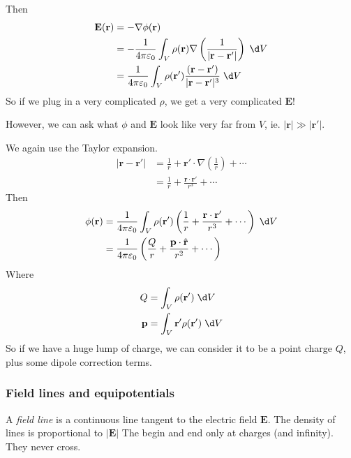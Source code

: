 \documentclass[a4paper]{article}
\begin{document}
Then
\begin{align*}
  \mathbf{E}(\mathbf{r}) &= -\nabla \phi(\mathbf{r})\\
  &=- \frac{1}{4\pi\varepsilon_0} \int_V \rho(\mathbf{r})\nabla \left(\frac{1}{|\mathbf{r} - \mathbf{r}'|}\right)\;\d V\\
  &= \frac{1}{4\pi\varepsilon_0}\int_V \rho(\mathbf{r}')\frac{(\mathbf{r} - \mathbf{r}')}{|\mathbf{r} - \mathbf{r}'|^3}\;\d V
\end{align*}
So if we plug in a very complicated $\rho$, we get a very complicated $\mathbf{E}$!

However, we can ask what $\phi$ and $\mathbf{E}$ look like very far from $V$, ie. $|\mathbf{r}| \gg |\mathbf{r}'|$. 

We again use the Taylor expansion.
\begin{align*}
  |\mathbf{r} - \mathbf{r}'| &= \frac{1}{r} + \mathbf{r}'\cdot \nabla\left(\frac{1}{r}\right) + \cdots\\
  &= \frac{1}{r} + \frac{\mathbf{r}\cdot \mathbf{r}'}{r^3} + \cdots
\end{align*}
Then
\begin{align*}
  \phi(\mathbf{r}) &= \frac{1}{4\pi\varepsilon_0} \int_V \rho(\mathbf{r}')\left(\frac{1}{r} + \frac{\mathbf{r}\cdot \mathbf{r}'}{r^3} + \cdots\right)\;\d V\\
  &= \frac{1}{4\pi\varepsilon_0}\left(\frac{Q}{r} + \frac{\mathbf{p}\cdot \hat{\mathbf{r}}}{r^2} + \cdots\right)
\end{align*}
Where
\begin{align*}
  Q &= \int_V \rho(\mathbf{r}')\;\d V \\
  \mathbf{p} &= \int_V \mathbf{r}'\rho(\mathbf{r}')\; \d V
\end{align*}
So if we have a huge lump of charge, we can consider it to be a point charge $Q$, plus some dipole correction terms. 
\subsubsection{Field lines and equipotentials}
\begin{defi}
  A \emph{field line} is a continuous line tangent to the electric field $\mathbf{E}$. The density of lines is proportional to $|\mathbf{E}|$ The begin and end only at charges (and infinity). They never cross.
\end{defi}
\end{document}
